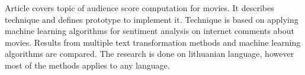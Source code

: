 \vspace{1.5cm}

Article covers topic of audience score computation for movies.
It describes technique and defines prototype to implement it. 
Technique is based on applying machine learning algorithms for sentiment
analysis on internet comments about movies. 
Results from multiple text transformation methods and machine learning algorithms
are compared. The research is done on lithuanian language, however most of the methods
applies to any language. 
